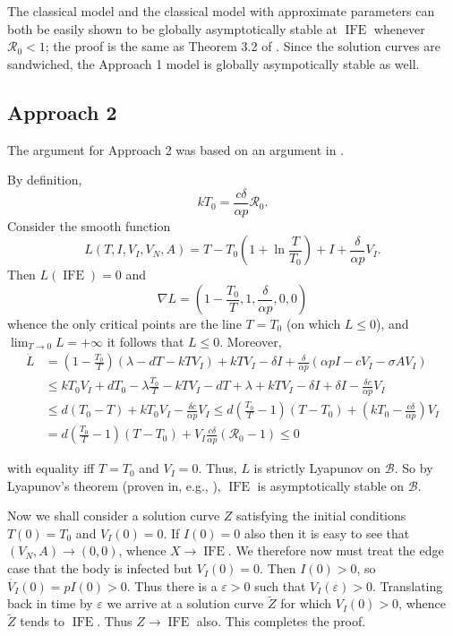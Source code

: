 \documentclass[]{elsarticle}
\newcommand{\BB}{\mathcal{B}}
\newcommand{\IFE}{\operatorname{IFE}}
\newcommand{\BRN}{\mathcal{R}_0}
\theoremstyle{definition}
\begin{document}
\begin{appendices}
    The classical model and the classical model with approximate parameters can both be easily shown to be globally asymptotically stable at $\IFE$ whenever $\BRN < 1$; the proof is the same as Theorem 3.2 of \cite{rahman2016impact}. Since the solution curves are sandwiched, the Approach 1 model is globally asympotically stable as well.
\subsection{Approach 2}
\label{global2}
 The argument for Approach 2 was based on an argument in \cite{Lyapunov}.

\label{app1b}
By definition,
$$kT_0 = \frac{c \delta}{\alpha p} \BRN.$$Consider the smooth function
$$L(T, I, V_I, V_N, A) = T - T_0\left(1 + \ln\frac{T}{T_0}\right) + I + \frac{\delta}{\alpha p} V_I.$$
Then $L(\IFE) = 0$ and $$\nabla L = \left(1 - \frac{T_0}{T}, 1, \frac{\delta}{\alpha p}, 0, 0\right)$$
whence the only critical points are the line $T = T_0$ (on which $L \leq 0$), and
$\lim_{T \to 0} L = +\infty$
it follows that $L \leq 0$. Moreover,
\begin{align*}
    \dot L &= \left(1 - \frac{T_0}{T} \right)(\lambda - dT - kTV_I) + kTV_I - \delta I + \frac{\delta}{\alpha p}(\alpha p I - cV_I - \sigma A V_I)\\
    &\leq kT_0 V_I + dT_0 - \lambda \frac{T_0}{T} - kTV_I - dT + \lambda + kTV_I - \delta I + \delta I - \frac{\delta c}{\alpha p} V_I\\
    &\leq d(T_0 - T) +kT_0 V_I -\frac{\delta c}{\alpha p} V_I
    \leq d\left(\frac{T_0}{T} - 1\right)(T - T_0) + \left(kT_0 - \frac{c\delta}{\alpha p}\right) V_I\\
    &= d\left(\frac{T_0}{T} - 1\right)(T - T_0) + V_I \frac{c \delta}{\alpha p}(\BRN - 1) \leq 0
\end{align*}

with equality iff $T = T_0$ and $V_I = 0$. Thus, $L$ is strictly Lyapunov on $\BB$. So by Lyapunov's theorem (proven in, e.g., \cite{robert2004differential}), $\IFE$ is asymptotically stable on $\BB$.

Now we shall consider a solution curve $Z$ satisfying the initial conditions $T(0) = T_0$ and $V_I(0) = 0$. If $I(0) = 0$ also then it is easy to see that $(V_N, A) \to (0, 0)$, whence $X \to \IFE$. We therefore now must treat the edge case that the body is infected but $V_I(0) = 0$. Then $I(0) > 0$, so $\dot{V_I}(0) = pI(0) > 0$. Thus there is a $\varepsilon > 0$ such that $V_I(\varepsilon) > 0$. Translating back in time by $\varepsilon$ we arrive at a solution curve $\tilde Z$ for which $V_I(0) > 0$, whence $\tilde Z$ tends to $\IFE$. Thus $Z \to \IFE$ also. This completes the proof.


\end{appendices}
\end{document}
